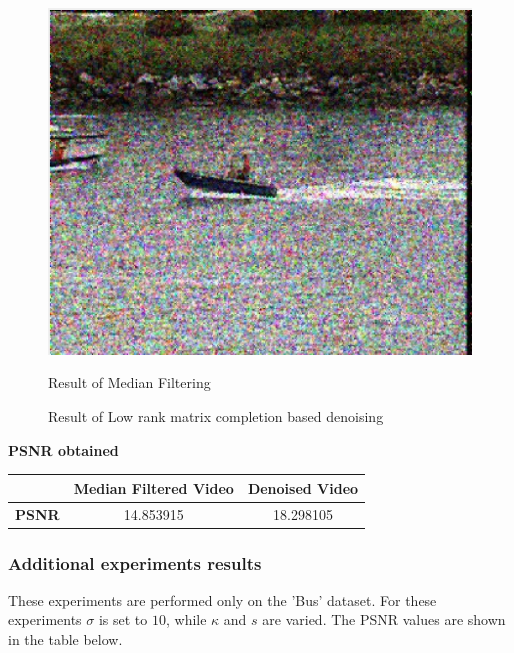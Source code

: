\documentclass{article}
\begin{document}
\begin{figure}[H]
    \centering
    \begin{minipage}{.45\textwidth}
        \centering
        \includegraphics[width=\linewidth]{Images/Coastguard_2_median_filter.png}
        \caption{Result of Median Filtering}
    \end{minipage}
    \begin{minipage}{.45\textwidth}
        \centering
        \caption{Result of Low rank matrix completion based denoising}
    \end{minipage}
\end{figure}

\textbf{PSNR obtained}
\begin{table}[H]
    \begin{tabular}{|c|c|c|}
    \hline
    \textbf{}     & Median Filtered Video & Denoised Video   \\
    \hline
    \textbf{PSNR} &          14.853915             &     18.298105           \\ 
    \hline
    \end{tabular}
    \end{table}

\newpage
\subsubsection*{Additional experiments results}
These experiments are performed only on the 'Bus' dataset. For these experiments $\sigma$ is set to $10$, while $\kappa$ and $s$ are varied. The PSNR values are shown in the table below.
\end{document}
